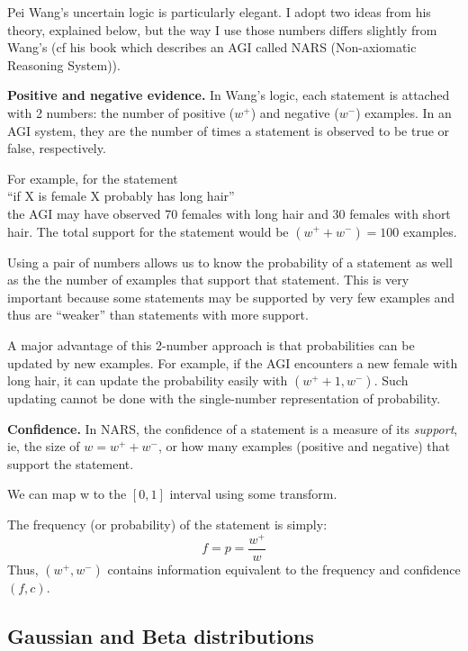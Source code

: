 Pei Wang's uncertain logic is particularly elegant.  I adopt two ideas from his theory, explained below, but the way I use those numbers differs slightly from Wang's (cf his book \citep*{Wang2006} which describes an AGI called NARS (Non-axiomatic Reasoning System)).

{\bfseries Positive and negative evidence.}  In Wang's logic, each statement is attached with 2 numbers: the number of positive ($w^+$) and negative ($w^-$) examples.  In an AGI system, they are the number of times a statement is observed to be true or false, respectively.

For example, for the statement\\
\hspace*{1cm} ``if X is female X probably has long hair''\\
the AGI may have observed 70 females with long hair and 30 females with short hair. The total support for the statement would be $(w^+ + w^-) = 100$ examples.

Using a pair of numbers allows us to know the probability of a statement as well as the the number of examples that support that statement. This is very important because some statements may be supported by very few examples and thus are ``weaker'' than statements with more support.

A major advantage of this 2-number approach is that probabilities can be updated by new examples. For example, if the AGI encounters a new female with long hair, it can update the probability easily with $ (w^+ + 1,w^-)$. Such updating cannot be done with the single-number representation of probability.

{\bfseries Confidence.}  In NARS, the confidence of a statement is a measure of its \emph{support}, ie, the size of $ w = w^+ + w^- $, or how many examples (positive and negative) that support the statement.

We can map w to the $[0,1]$ interval using some transform.

The frequency (or probability) of the statement is simply:
\begin{equation}
f = p = \frac{w^+}{w}
\end{equation}
Thus, $(w^+,w^-)$ contains information equivalent to the frequency and confidence $ (f,c) $.

\subsection{Gaussian and Beta distributions}

